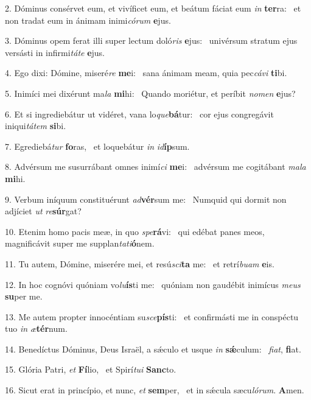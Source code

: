 2. Dóminus consérvet eum, et vivíficet eum, et beátum fáciat eum \textit{in} \textbf{ter}ra: \ast\  et non tradat eum in ánimam inimi\textit{có}\textit{rum} \textbf{e}jus.\

3. Dóminus opem ferat illi super lectum doló\textit{ris} \textbf{e}jus: \ast\  univérsum stratum ejus versásti in infirmi\textit{tá}\textit{te} \textbf{e}jus.\

4. Ego dixi: Dómine, miseré\textit{re} \textbf{me}i: \ast\  sana ánimam meam, quia pec\textit{cá}\textit{vi} \textbf{ti}bi.\

5. Inimíci mei dixérunt ma\textit{la} \textbf{mi}hi: \ast\  Quando moriétur, et períbit \textit{no}\textit{men} \textbf{e}jus?\

6. Et si ingrediebátur ut vidéret, vana lo\textit{que}\textbf{bá}tur: \ast\  cor ejus congregávit iniqui\textit{tá}\textit{tem} \textbf{si}bi.\

7. Egrediebá\textit{tur} \textbf{fo}ras, \ast\  et loquebátur \textit{in} \textit{id}\textbf{íp}sum.\

8. Advérsum me susurrábant omnes inimí\textit{ci} \textbf{me}i: \ast\  advérsum me cogitábant \textit{ma}\textit{la} \textbf{mi}hi.\

9. Verbum iníquum constituérunt \textit{ad}\textbf{vér}sum me: \ast\  Numquid qui dormit non adjíciet \textit{ut} \textit{re}\textbf{súr}gat?\

10. Etenim homo pacis meæ, in quo \textit{spe}\textbf{rá}vi: \ast\  qui edébat panes meos, magnificávit super me supplan\textit{ta}\textit{ti}\textbf{ó}nem.\

11. Tu autem, Dómine, miserére mei, et resú\textit{sci}\textbf{ta} me: \ast\  et retrí\textit{bu}\textit{am} \textbf{e}is.\

12. In hoc cognóvi quóniam vo\textit{lu}\textbf{ís}ti me: \ast\  quóniam non gaudébit inimícus \textit{me}\textit{us} \textbf{su}per me.\

13. Me autem propter innocéntiam su\textit{sce}\textbf{pís}ti: \ast\  et confirmásti me in conspéctu tuo \textit{in} \textit{æ}\textbf{tér}num.\

14. Benedíctus Dóminus, Deus Israël, a sǽculo et usque \textit{in} \textbf{sǽ}culum: \ast\  \textit{fi}\textit{at}, \textbf{fi}at.\

15. Glória Patri, \textit{et} \textbf{Fí}lio, \ast\  et Spirí\textit{tu}\textit{i} \textbf{Sanc}to.\

16. Sicut erat in princípio, et nunc, \textit{et} \textbf{sem}per, \ast\  et in sǽcula sæcu\textit{ló}\textit{rum}. \textbf{A}men.\

